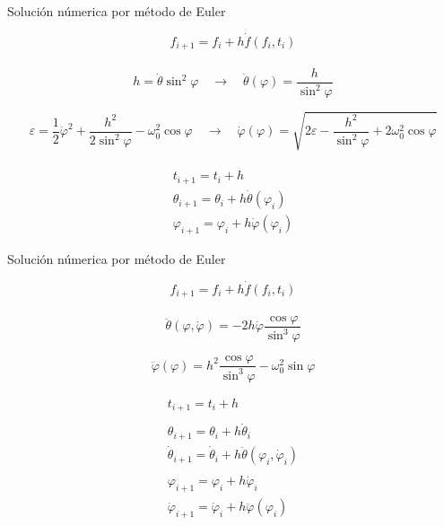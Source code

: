 \documentclass[10pt,a4papper]{article}
\begin{document}
\newpage
Solución númerica por método de Euler

\[f_{i+1}=f_i+h\dot f(f_i,t_i)\]\\

\[h=\dot\theta\sin^2\varphi\quad\to\quad\dot\theta(\varphi)=\frac{h}{\sin^2\varphi}\]

\[\varepsilon=\frac{1}{2}\dot\varphi^2+\frac{h^2}{2\sin^2\varphi}-\omega_0^2\cos\varphi\quad\to\quad
\dot\varphi(\varphi)=\sqrt{2\varepsilon-\frac{h^2}{\sin^2\varphi}+2\omega_0^2\cos\varphi}\]\\

\[\boxed{
  \begin{array}{rcl}
    t_{i+1}=t_i+h\\
    \theta_{i+1}=\theta_i+h\dot\theta(\varphi_{i})\\
    \varphi_{i+1}=\varphi_i+h\dot\varphi(\varphi_{i})
  \end{array}
}
\]

\newpage
Solución númerica por método de Euler

\[f_{i+1}=f_i+h\dot f(f_i,t_i)\]\\

\[\ddot\theta(\varphi,\dot\varphi)=-2h\dot\varphi\frac{\cos\varphi}{\sin^3\varphi}\]

\[\ddot\varphi(\varphi)=h^2\frac{\cos\varphi}{\sin^3\varphi}-\omega_0^2\sin\varphi\]

\[\boxed{
  \begin{array}{rcl}
    t_{i+1}=t_i+h\\\\
    \theta_{i+1}=\theta_i+h\dot\theta_{i}\\
    \dot\theta_{i+1}=\dot\theta_i+h\ddot\theta(\varphi_i,\dot\varphi_i)\\\\
    \varphi_{i+1}=\varphi_i+h\dot\varphi_{i}\\
    \dot\varphi_{i+1}=\dot\varphi_i+h\ddot\varphi(\varphi_i)
  \end{array}
}
\]
\end{document}
